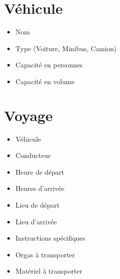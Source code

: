 \section{Véhicule}
\begin{itemize}
\item Nom
\item Type (Voiture, Minibus, Camion)
\item Capacité en personnes
\item Capacité en volume

\end{itemize}

\section{Voyage}
\begin{itemize}
\item Véhicule
\item Conducteur
\item Heure de départ
\item Heures d'arrivée
\item Lieu de départ
\item Lieu d'arrivée
\item Instructions spécifiques
\item Orgas à transporter
\item Matériel à transporter
\end{itemize}


